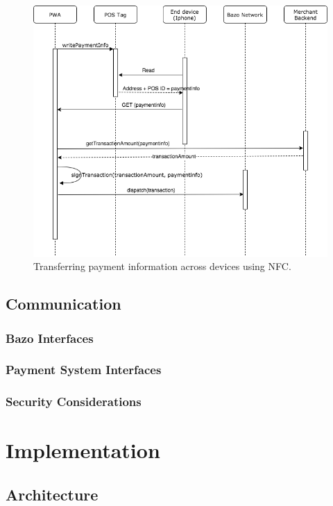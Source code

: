 \begin{figure}
\centering
\includegraphics[width=1\textwidth]{diagrams/POS_flow.png}
\caption{\label{fig:POS}Transferring payment information across devices using NFC.}
\end{figure}

\section{Communication}
\subsection{Bazo Interfaces}
\subsection{Payment System Interfaces}

\subsection{Security Considerations}







\chapter{Implementation}
\section{Architecture}
